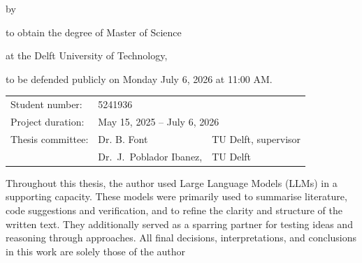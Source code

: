 
\begin{titlepage}

\begin{center}

{\makeatletter
\largetitlestyle\fontsize{45}{45}\selectfont\@title
\makeatother}

{\makeatletter
\ifdefvoid{\@subtitle}{}{\bigskip\titlestyle\fontsize{20}{20}\selectfont\@subtitle}
\makeatother}

\bigskip
\bigskip

by

\bigskip
\bigskip

{\makeatletter
\largetitlestyle\fontsize{25}{25}\selectfont\@author
\makeatother}

\bigskip
\bigskip

to obtain the degree of Master of Science 


at the Delft University of Technology,

to be defended publicly on Monday July 6, 2026 at 11:00 AM.

\vfill

\begin{tabular}{lll}
    Student number: & 5241936 \\
    Project duration: & \multicolumn{2}{l}{May 15, 2025 -- July 6, 2026} \\
    Thesis committee: & Dr. B. Font & TU Delft, supervisor \\
        & Dr.\ J.\ Poblador Ibanez, & TU Delft \\
\end{tabular}

\bigskip
\bigskip

Throughout this thesis, the author used Large Language Models (LLMs) in a supporting capacity. These models were primarily used to summarise literature, code suggestions and verification, and to refine the clarity and structure of the written text. They additionally served as a sparring partner for testing ideas and reasoning through approaches. All final decisions, interpretations, and conclusions in this work are solely those of the author


\end{center}
\end{titlepage}
